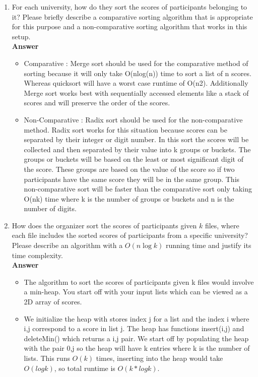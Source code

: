 \documentclass{article}
\begin{document}
\begin{enumerate}

\item For each university, how do they sort the scores of participants
  belonging to it? Please briefly describe a comparative sorting
  algorithm that is appropriate for this purpose and a non-comparative
  sorting algorithm that works in this setup.\\
  
\textbf{ Answer }
\begin{itemize}
\item Comparative : Merge sort should be used for the comparative method of sorting because it will only take O(nlog(n)) time to sort a list of n scores. Whereas quicksort will have a worst case runtime of O(n2). Additionally Merge sort works best with sequentially accessed elements like a stack of scores and will preserve the order of the scores.

\item Non-Comparative : Radix sort should be used for the non-comparative method. Radix sort works for this situation because scores can be separated by their integer or digit number. In this sort the scores will be collected and then separated by their value into k groups or buckets. The groups or buckets will be based on the least or most significant digit of the score. These groups are based on the value of the score so if two participants have the same score they will be in the same group. This non-comparative sort will be faster than the comparative sort only taking O(nk) time where k is the number of groups or buckets and n is the number of digits.
\end{itemize}

\item How does the organizer sort the scores of participants given $k$
  files, where each file includes the sorted scores of participants
  from a specific university?  Please describe an algorithm with a
  $O(n\log k)$ running time and justify its time complexity.\\
  
\textbf{ Answer }
\begin{itemize}
\item The algorithm to sort the scores of participants given k files would involve a min-heap. You start off with your input lists which can be viewed as a 2D array of scores.

\item We initialize the heap with stores index j for a list and the index i where i,j correspond to a score in list j. The heap has functions insert(i,j) and deleteMin() which returns a i,j pair. We start off by populating the heap with the pair 0,j so the heap will have k entries where k is the number of lists. This runs $O(k)$ times, inserting into the heap would take $O(logk)$, so total runtime is $O(k*logk)$.


\end{itemize}
\end{enumerate}
\end{document}

